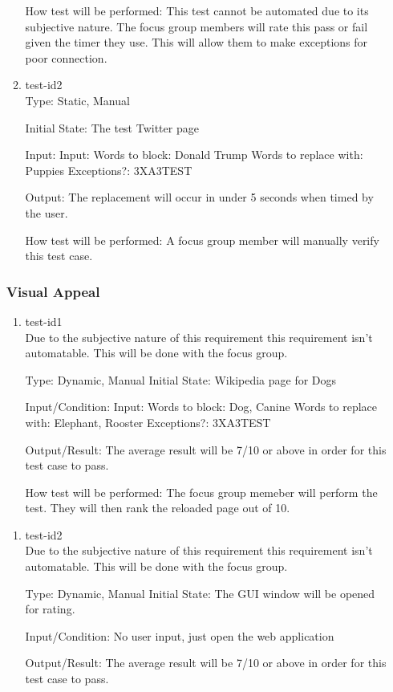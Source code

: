 \documentclass[12pt, titlepage]{article}
\begin{document}
\begin{enumerate}
\begin{enumerate}
How test will be performed: This test cannot be automated due to its subjective nature. The focus group members will rate this pass or fail given the timer they use. This will allow them to make exceptions for poor connection.
					
\item{test-id2\\}
Type: Static, Manual
					
Initial State: The test Twitter page
					
Input:
Input:  Words to block: Donald Trump
Words to replace with: Puppies
Exceptions?: 3XA3TEST
					
Output: The replacement will occur in under 5 seconds when timed by the user.
					
How test will be performed: A focus group member will manually verify this test case.
\end{enumerate}
\subsubsection{Visual Appeal}
\begin{enumerate}
\item{test-id1\\}
Due to the subjective nature of this requirement this requirement isn't automatable. This will be done with the focus group.

Type: Dynamic, Manual
Initial State: Wikipedia page for Dogs
					
Input/Condition: Input: Words to block: Dog, Canine
Words to replace with: Elephant, Rooster
Exceptions?: 3XA3TEST
					
Output/Result: The average result will be 7/10 or above in order for this test case to pass.
					
How test will be performed: The focus group memeber will perform the test. They will then rank the reloaded page out of 10.
\end{enumerate}
\begin{enumerate}
\item{test-id2\\}
Due to the subjective nature of this requirement this requirement isn't automatable. This will be done with the focus group.

Type: Dynamic, Manual
Initial State: The GUI window will be opened for rating.
					
Input/Condition: No user input, just open the web application
					
Output/Result: The average result will be 7/10 or above in order for this test case to pass.
					

\end{enumerate}
\end{enumerate}
\end{document}

